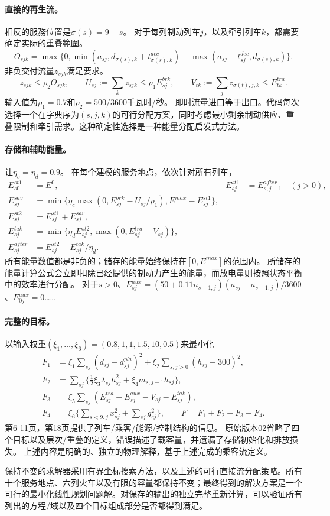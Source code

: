 \documentclass[11pt]{article}
\begin{document}
\paragraph{直接的再生流。}
相反的服務位置是$\sigma(s)=9-s$。  
对于每列制动列车$j$，以及牵引列车$k$，都需要确定实际的重叠範圍。
\[
 O_{sjk}=\max\{0,\min(a_{sj},d_{\sigma(s),k}+t^{acc}_{\sigma(s),k})
 -\max(a_{sj}-t^{dec}_{sj},d_{\sigma(s),k})\}.
\]
非负交付流量$z_{sjk}$满足要求。
\[
 z_{sjk}\le \rho_2 O_{sjk},\qquad
 U_{sj}:=\sum_kz_{sjk}\le\rho_1E^{brk}_{sj},\qquad
 V_{tk}:=\sum_{j}z_{\sigma(t),j,k}\le E^{tra}_{tk}.
\]
输入值为$\rho_1=0.7$和$\rho_2=500/3600$千瓦时/秒。
即时流量进口等于出口。代码每次选择一个在字典序为$(s,j,k)$的可行分配方案，同时考虑最小剩余制动供应、重叠限制和牵引需求。这种确定性选择是一种能量分配启发式方法。

\paragraph{存储和辅助能量。}
让$\eta_c=\eta_d=0.9$。  
在每个建模的服务地点，依次针对所有列车，
\begin{align}
E^{st1}_{s0}&=E^0,&
E^{st1}_{sj}&=E^{after}_{s,j-1}\quad(j>0),\\
E^{sav}_{sj}&=\min\{\eta_c\max(0,E^{brk}_{sj}-U_{sj}/\rho_1),
                      E^{max}-E^{st1}_{sj}\},\\
E^{st2}_{sj}&=E^{st1}_{sj}+E^{sav}_{sj},\\
E^{tak}_{sj}&=\min\{\eta_d E^{st2}_{sj},\max(0,E^{tra}_{sj}-V_{sj})\},\\
E^{after}_{sj}&=E^{st2}_{sj}-E^{tak}_{sj}/\eta_d.
\end{align}
所有能量数值都是非负的；储存的能量始终保持在$[0,E^{max}]$的范围内。  
所储存的能量计算公式会立即扣除已经提供的制动力产生的能量，而放电量则按照状态平衡中的效率进行分配。  
对于$s>0$、$E^{aux}_{sj}=(50+0.11n_{s-1,j})(a_{sj}-a_{s-1,j})/3600$、$E^{aux}_{0j}=0$……

\paragraph{完整的目标。}
以输入权重$(\xi_1,\ldots,\xi_6)=(0.8,1,1,1.5,10,0.5)$来最小化
\begin{align}
F_1&=\xi_1\sum_{sj}(d_{sj}-d^{pla}_{sj})^2
       +\xi_2\sum_{s,j>0}(h_{sj}-300)^2,\\
F_2&=\sum_{sj}\{\tfrac12\xi_3\lambda_{sj}h_{sj}^2
                         +\xi_4m_{s,j-1}h_{sj}\},\\
F_3&=\xi_5\sum_{sj}(E^{tra}_{sj}+E^{aux}_{sj}-V_{sj}-E^{tak}_{sj}),\\
F_4&=\xi_6\{\sum_{s<9,j}x_{sj}^2+\sum_{sj}g_{sj}^2\},\qquad
F=F_1+F_2+F_3+F_4.
\end{align}
第6-11页，第18页提供了列车/乘客/能源/控制结构的信息。  
原始版本02省略了四个目标以及层次/重叠的定义，错误描述了载客量，并遗漏了存储初始化和排放损失。  
上述内容是明确的、独立的物理解释，基于上述完成的乘客流定义。

保持不变的求解器采用有界坐标搜索方法，以及上述的可行直接流分配策略。所有十个服务地点、六列火车以及有限的容量都保持不变；最终得到的解决方案是一个可行的最小化线性规划问题解。对保存的输出的独立完整重新计算，可以验证所有列出的方程/域以及四个目标组成部分是否都得到满足。
\end{document}
